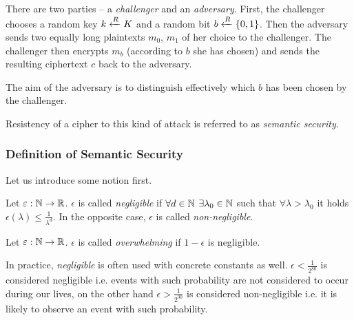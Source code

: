 \begin{game}
\label{game:semsec}
	There are two parties -- a {\em challenger} and an {\em adversary}. First, the challenger chooses a random key $k\xleftarrow{R} K$ and a random bit $b\xleftarrow{R}\{0,1\}$. Then the adversary sends two equally long plaintexts $m_0$, $m_1$ of her choice to the challenger. The challenger then encrypts $m_b$ (according to $b$ she has chosen) and sends the resulting ciphertext $c$ back to the adversary.
	
	The aim of the adversary is to distinguish effectively which $b$ has been chosen by the challenger.
\end{game}

\begin{note}
\label{note:semsec}
	Resistency of a cipher to this kind of attack is referred to as {\em semantic security}.
\end{note}

\subsubsection{Definition of Semantic Security}

Let us introduce some notion first.

\begin{defn}
\label{def:neglfunc}
	Let $\varepsilon:\mathbb{N}\rightarrow\mathbb{R}$. $\epsilon$ is called {\em negligible} if $\forall d\in\mathbb{N}$ $\exists \lambda_0\in\mathbb{N}$ such that $\forall \lambda>\lambda_0$ it holds $\epsilon(\lambda)\leq\frac{1}{\lambda^d}$. In the opposite case, $\epsilon$ is called {\em non-negligible}.
\end{defn}

\begin{defn}
\label{def:overwh}
	Let $\varepsilon:\mathbb{N}\rightarrow\mathbb{R}$. $\epsilon$ is called {\em overwhelming} if $1-\epsilon$ is negligible.
\end{defn}

\begin{note}
\label{note:neglconst}
	In practice, {\em negligible} is often used with concrete constants as well. $\epsilon<\frac{1}{2^{80}}$ is considered negligible i.e. events with such probability are not considered to occur during our lives, on the other hand $\epsilon>\frac{1}{2^{30}}$ is considered non-negligible i.e. it is likely to observe an event with such probability.
\end{note}

